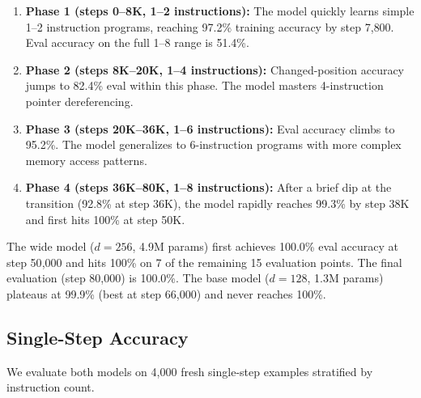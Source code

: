 \documentclass[11pt,a4paper]{article}
\begin{document}
\begin{enumerate}[nosep]
  \item \textbf{Phase 1 (steps 0--8K, 1--2 instructions):} The model quickly learns simple 1--2 instruction programs, reaching 97.2\% training accuracy by step 7{,}800. Eval accuracy on the full 1--8 range is 51.4\%.
  \item \textbf{Phase 2 (steps 8K--20K, 1--4 instructions):} Changed-position accuracy jumps to 82.4\% eval within this phase. The model masters 4-instruction pointer dereferencing.
  \item \textbf{Phase 3 (steps 20K--36K, 1--6 instructions):} Eval accuracy climbs to 95.2\%. The model generalizes to 6-instruction programs with more complex memory access patterns.
  \item \textbf{Phase 4 (steps 36K--80K, 1--8 instructions):} After a brief dip at the transition (92.8\% at step 36K), the model rapidly reaches 99.3\% by step 38K and first hits 100\% at step 50K.
\end{enumerate}

\begin{finding}
The wide model ($d{=}256$, 4.9M params) first achieves 100.0\% eval accuracy at step 50{,}000 and hits 100\% on 7 of the remaining 15 evaluation points.
The final evaluation (step 80{,}000) is 100.0\%.
The base model ($d{=}128$, 1.3M params) plateaus at 99.9\% (best at step 66{,}000) and never reaches 100\%.
\end{finding}

\subsection{Single-Step Accuracy}

We evaluate both models on 4{,}000 fresh single-step examples stratified by instruction count.
\end{document}
